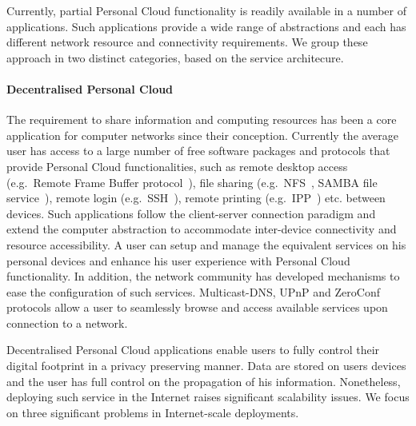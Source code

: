 Currently, partial Personal Cloud functionality is readily available in a number
of applications. Such applications provide a wide range of abstractions and each
has different network resource and connectivity requirements. We group these
approach in two distinct categories, based on the service architecure. 

\paragraph*{Decentralised Personal Cloud}

The requirement to share information and computing resources has been a core
application for computer networks since their conception. Currently the average
user has access to a large number of free software packages and protocols that
provide Personal Cloud functionalities, such as remote desktop access
(e.g.~Remote Frame Buffer protocol~\cite{RFC6143}), file sharing
(e.g.~NFS~\cite{RFC3530}, SAMBA file service~\cite{samba}), remote login
(e.g.~SSH~\cite{RFC4253}), remote printing (e.g.~IPP~\cite{RFC2911}) etc.
between devices. Such applications follow the client-server connection paradigm
and extend the computer abstraction to accommodate inter-device connectivity and
resource accessibility. A user can setup and manage the equivalent
services on his personal devices and enhance his user experience with Personal
Cloud functionality.  In addition, the network community has developed
mechanisms to ease the configuration of such services.  Multicast-DNS, UPnP and
ZeroConf protocols allow a user to seamlessly browse and access available
services upon connection to a network. 

Decentralised Personal Cloud applications enable users to fully control their
digital footprint in a privacy preserving manner. Data are stored on users
devices and the user has full control on the propagation of his information. 
Nonetheless, deploying such service in the Internet raises significant
scalability issues. We focus on three significant problems in Internet-scale
deployments. 

